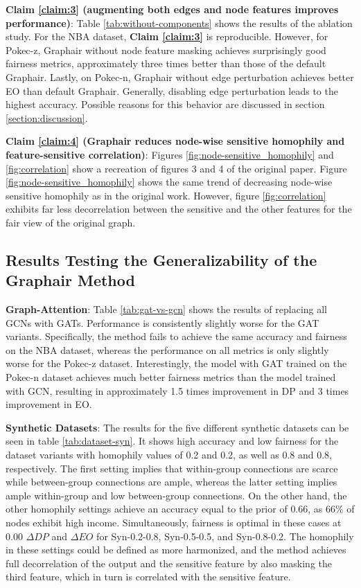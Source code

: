 \textbf{Claim \ref{claim:3} (augmenting both edges and node features improves performance)}: Table \ref{tab:without-components} shows the results of the ablation study. 
For the NBA dataset, \textbf{Claim \ref{claim:3}} is reproducible. 
However, for Pokec-z, Graphair without node feature masking achieves surprisingly good fairness metrics, approximately three times better than those of the default Graphair. 
Lastly, on Pokec-n, Graphair without edge perturbation achieves better EO than default Graphair. 
Generally, disabling edge perturbation leads to the highest accuracy. 
Possible reasons for this behavior are discussed in section \ref{section:discussion}.

\textbf{Claim \ref{claim:4} (Graphair reduces node-wise sensitive homophily and feature-sensitive correlation)}: Figures \ref{fig:node-sensitive_homophily} and \ref{fig:correlation} show a recreation of figures 3 and 4 of the original paper. Figure \ref{fig:node-sensitive_homophily} shows the same trend of decreasing node-wise sensitive homophily as in the original work. However, figure \ref{fig:correlation} exhibits far less decorrelation between the sensitive and the other features for the fair view of the original graph.

\subsection{Results Testing the Generalizability of the Graphair Method}

\textbf{Graph-Attention}: Table \ref{tab:gat-vs-gcn} shows the results of replacing all GCNs with GATs. Performance is consistently slightly worse for the GAT variants. 
Specifically, the method fails to achieve the same accuracy and fairness on the NBA dataset, whereas the performance on all metrics is only slightly worse for the Pokec-z dataset. 
Interestingly, the model with GAT trained on the Pokec-n dataset achieves much better fairness metrics than the model trained with GCN, resulting in approximately 1.5 times improvement in DP and 3 times improvement in EO.

\textbf{Synthetic Datasets}: The results for the five different synthetic datasets can be seen in table \ref{tab:dataset-syn}. It shows high accuracy and low fairness for the dataset variants with homophily values of 0.2 and 0.2, as well as 0.8 and 0.8, respectively. The first setting implies that within-group connections are scarce while between-group connections are ample, whereas the latter setting implies ample within-group and low between-group connections. On the other hand, the other homophily settings achieve an accuracy equal to the prior of $0.66$, as $66\%$ of nodes exhibit high income. Simultaneously, fairness is optimal in these cases at $0.00$ $\Delta DP$ and $\Delta EO$ for Syn-0.2-0.8, Syn-0.5-0.5, and Syn-0.8-0.2. The homophily in these settings could be defined as more harmonized, and the method achieves full decorrelation of the output and the sensitive feature by also masking the third feature, which in turn is correlated with the sensitive feature.

